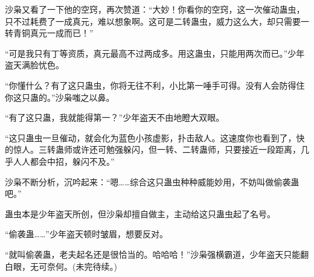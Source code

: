 \begin{this_body}
沙枭又看了一下他的空窍，再次赞道：“大妙！你看你的空窍，这一次催动蛊虫，只不过耗费了一成真元，难以想象啊。这可是二转蛊虫，威力这么大，却只需要一转青铜真元一成而已！”

“可是我只有丁等资质，真元最高不过两成多。用这蛊虫，只能用两次而已。”少年盗天满脸忧色。

“你懂什么？有了这只蛊虫，你将无往不利，小比第一唾手可得。没有人会防得住你这只蛊的。”沙枭嗤之以鼻。

“有了这只蛊，我就能得第一？”少年盗天不由地瞪大双眼。

“这只蛊虫一旦催动，就会化为蓝色小孩虚影，扑击敌人。这速度你也看到了，快的惊人。三转蛊师或许还可勉强躲闪，但一转、二转蛊师，只要接近一段距离，几乎人人都会中招，躲闪不及。”

沙枭不断分析，沉吟起来：“嗯……综合这只蛊虫种种威能妙用，不妨叫做偷袭蛊吧。”

蛊虫本是少年盗天所创，但沙枭却擅自做主，主动给这只蛊虫起了名号。

“偷袭蛊……”少年盗天顿时皱眉，想要反对。

“就叫偷袭蛊，老夫起名还是很恰当的。哈哈哈！”沙枭强横霸道，少年盗天只能翻白眼，无可奈何。(未完待续。)

\end{this_body}

